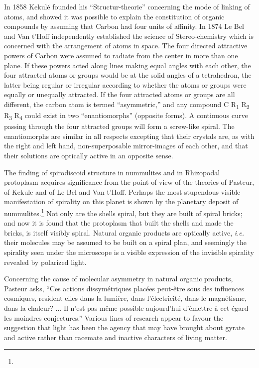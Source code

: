 \documentclass[a4paper, 12pt, oneside]{article}
\begin{document}
In 1858 Kekulé founded his ``Structur-theorie'' concerning the mode of linking of atoms, and showed it was possible to explain the constitution of organic compounds by assuming that Carbon had four units of affinity. In 1874 Le Bel and Van t'Hoff independently established the science of Stereo-chemistry which is concerned with the arrangement of atoms in space. The four directed attractive powers of Carbon were assumed to radiate from the center in more than one plane. If these powers acted along lines making equal angles with each other, the four attracted atoms or groups would be at the solid angles of a tetrahedron, the latter being regular or irregular according to whether the atoms or groups were equally or unequally attracted. If the four attracted atoms or groups are all different, the carbon atom is termed ``asymmetric,'' and any compound C R\textsubscript{1} R\textsubscript{2} R\textsubscript{3} R\textsubscript{4} could exist in two ``enantiomorphs'' (opposite forms). A continuous curve passing through the four attracted groups will form a screw-like spiral. The enantiomorphs are similar in all respects excepting that their crystals are, as with the right and left hand, non-superposable mirror-images of each other, and that their solutions are optically active in an opposite sense.

The finding of spirodiscoid structure in nummulites and in Rhizopodal protoplasm acquires significance from the point of view of the theories of Pasteur, of Kekule and of Le Bel and Van t'Hoff. Perhaps the most stupendous visible manifestation of spirality on this planet is shown by the planetary deposit of nummulites.\footnote{} Not only are the shells spiral, but they are built of spiral bricks; and now it is found that the protoplasm that built the shells and made the bricks, is itself visibly spiral. Natural organic products are optically active, \emph{i.e.} their molecules may be assumed to be built on a spiral plan, and seemingly the spirality seen under the microscope is a visible expression of the invisible spirality revealed by polarized light.

Concerning the cause of molecular asymmetry in natural organic products, Pasteur asks, ``Ces actions dissymétriques placées peut-être sous des influences cosmiques, resident elles dans la lumière, dans l'électricité, dans le magnétisme, dans la chaleur? ... Il n'est pas même possible aujourd'hui d'émettre à cet égard les moindres conjectures.'' Various lines of research appear to favour the suggestion that light has been the agency that may have brought about gyrate and active rather than racemate and inactive characters of living matter.
\end{document}
